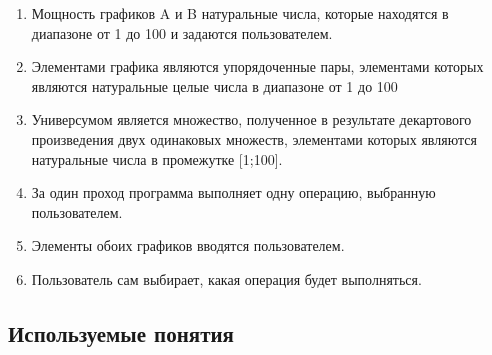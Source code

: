 \documentclass[a4paper,12pt]{extarticle}
\begin{document}
\begin{enumerate}
  \item Мощность графиков A и B натуральные числа, которые находятся в диапазоне от 1 до 100 и задаются пользователем.
  \item Элементами графика являются упорядоченные пары, элементами которых являются натуральные целые числа в диапазоне от 1 до 100
  \item Универсумом является множество, полученное в результате декартового произведения двух одинаковых множеств, элементами которых являются натуральные числа в промежутке [1;100].
  \item За один проход программа выполняет одну операцию, выбранную пользователем.
  \item Элементы обоих графиков вводятся пользователем.
  \item Пользователь сам выбирает, какая операция будет выполняться.
\end{enumerate}
\begin{center}
\section*{Используемые понятия}
\end{center}
\end{document}
